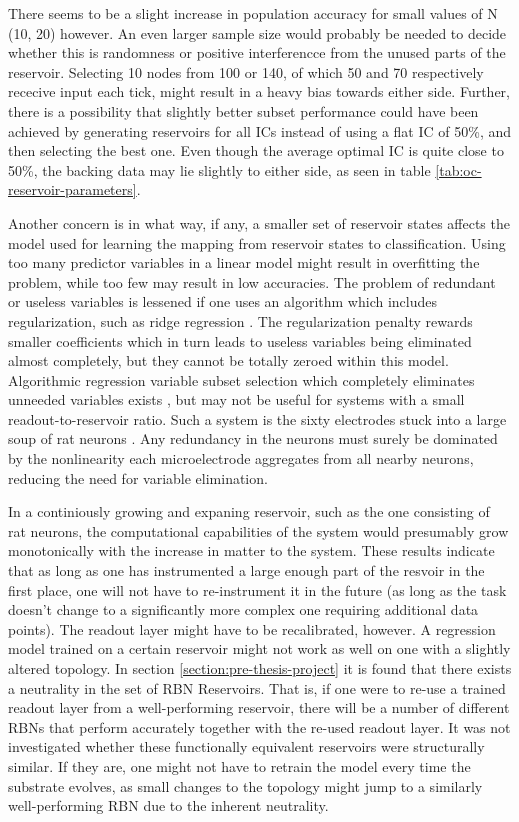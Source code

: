 There seems to be a slight increase in population accuracy for small values of N (10, 20) however.
An even larger sample size would probably be needed to decide whether this is randomness or positive interferencce from the unused parts of the reservoir.
Selecting 10 nodes from 100 or 140, of which 50 and 70 respectively rececive input each tick, might result in a heavy bias towards either side.
Further, there is a possibility that slightly better subset performance could have been achieved by generating reservoirs for all ICs instead of using a flat IC of 50\%,
and then selecting the best one.
Even though the average optimal IC is quite close to 50\%,
the backing data may lie slightly to either side,
as seen in table \ref{tab:oc-reservoir-parameters}.

Another concern is in what way, if any, a smaller set of reservoir states affects the model used for learning the mapping from reservoir states to classification.
Using too many predictor variables in a linear model might result in overfitting the problem,
while too few may result in low accuracies.
The problem of redundant or useless variables is lessened if one uses an algorithm which includes regularization,
such as ridge regression \cite{hoerl1970ridge}.
The regularization penalty rewards smaller coefficients which in turn leads to useless variables being eliminated almost completely,
but they cannot be totally zeroed within this model.
Algorithmic regression variable subset selection which completely eliminates unneeded variables exists \cite{miller2002subset},
but may not be useful for systems with a small readout-to-reservoir ratio.
Such a system is the sixty electrodes stuck into a large soup of rat neurons \cite{demarse2005adaptive}.
Any redundancy in the neurons must surely be dominated by the nonlinearity each microelectrode aggregates from all nearby neurons,
reducing the need for variable elimination.

In a continiously growing and expaning reservoir,
such as the one consisting of rat neurons,
the computational capabilities of the system would presumably grow monotonically with the increase in matter to the system.
These results indicate that as long as one has instrumented a large enough part of the resvoir in the first place,
one will not have to re-instrument it in the future (as long as the task doesn't change to a significantly more complex one requiring additional data points).
The readout layer might have to be recalibrated, however.
A regression model trained on a certain reservoir might not work as well on one with a slightly altered topology.
In section \ref{section:pre-thesis-project} it is found that there exists a neutrality in the set of RBN Reservoirs.
That is, if one were to re-use a trained readout layer from a well-performing reservoir,
there will be a number of different RBNs that perform accurately together with the re-used readout layer.
It was not investigated whether these functionally equivalent reservoirs were structurally similar.
If they are, one might not have to retrain the model every time the substrate evolves,
as small changes to the topology might jump to a similarly well-performing RBN due to the inherent neutrality.
